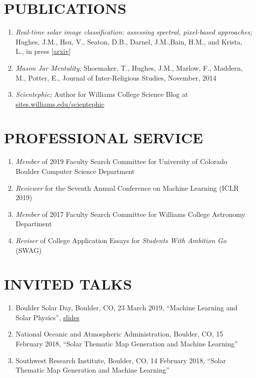 \documentclass[line,margin]{res}
\begin{document}
\begin{resume}
  \section{PUBLICATIONS}
  \begin{enumerate}[leftmargin=*]
    \item {\sl Real-time solar image classification: assessing  spectral,  pixel-based approaches;} Hughes, J.M., Hsu, V., Seaton, D.B., Darnel, J.M.,Bain, H.M., and Krista, L., in press [\href{https://arxiv.org/abs/1910.00144}{arxiv}]
  \item {\sl Mason Jar Mentality;} Shoemaker, T., Hughes, J.M., Marlow, F., Maddern, M., Potter, E.,
    Journal of Inter-Religious Studies, November, 2014
  \item {\sl Scientephic;} Author for Williams College Science Blog at \href{https://sites.williams.edu/scientephic/}{sites.williams.edu/scientephic}

  \end{enumerate}

  
  \section{PROFESSIONAL SERVICE}
  \begin{enumerate}[leftmargin=*]
  \item {\sl Member} of 2019 Faculty Search Committee for University of Colorado Boulder Computer Science Department
  \item {\sl Reviewer} for the Seventh Annual Conference on Machine Learning (ICLR 2019)
  \item {\sl Member} of 2017 Faculty Search Committee for Williams College Astronomy Department
  \item {\sl Reviser} of College Application Essays for \textit{Students With Ambition Go} (SWAG)
  \end{enumerate}

  \section{INVITED TALKS}
  \begin{enumerate}[leftmargin=*]
  \item Boulder Solar Day, Boulder, CO, 23 March 2019, ``Machine Learning and Solar Physics'', \href{https://drive.google.com/open?id=1j5R_wpHwaYO6ZDdx2zjAtdNeyvL2uC9n}{slides}
  \item National Oceanic and Atmospheric Administration, Boulder, CO, 15 February 2018, ``Solar Thematic Map Generation and Machine Learning''
  \item Southwest Research Institute, Boulder, CO, 14 February 2018, ``Solar Thematic Map Generation and Machine Learning''
  \end{enumerate}
  

\end{resume}
\end{document}
